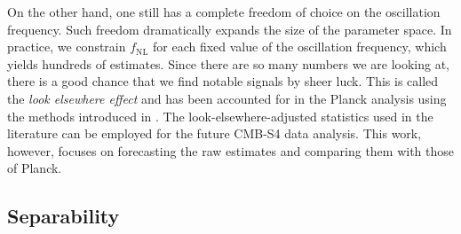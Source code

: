On the other hand, one still has a complete freedom of choice on the oscillation frequency. Such freedom dramatically expands the size of the parameter space. In practice, we constrain $f_\text{NL}$ for each fixed value of the oscillation frequency, which yields hundreds of estimates. Since there are so many numbers we are looking at, there is a good chance that we find notable signals by sheer luck. This is called the \textit{look elsewhere effect} and has been accounted for in the Planck analysis \cite{PlanckCollaboration2015,PlanckCollaboration2018} using the methods introduced in \cite{Fergusson2015a,Fergusson2015b}. The look-elsewhere-adjusted statistics used in the literature can be employed for the future CMB-S4 data analysis. This work, however, focuses on forecasting the raw estimates and comparing them with those of Planck.


\subsection{Separability}

